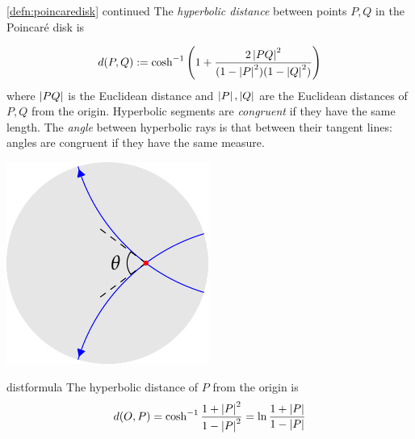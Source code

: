 \begin{defn*}{\ref{defn:poincaredisk} continued}
	The \emph{hyperbolic distance} between points $P,Q$ in the Poincaré disk is\footnotemark{}

	\begin{minipage}[t]{0.7\linewidth}\vspace{-12pt}
		\[
			d(P,Q):=\cosh^{-1}\left(1+\frac{2\left| PQ\right|^2}{(1-\left| P\right|^2)(1-\left| Q\right|^2)}\right)
		\]
		where $\left| PQ\right|$ is the Euclidean distance and $\left| P\right|,\left| Q\right|$ are the Euclidean distances of $P,Q$ from the origin.\smallbreak
		Hyperbolic segments are \emph{congruent} if they have the same length.\smallbreak
		The \emph{angle} between hyperbolic rays is that between their tangent lines: angles are congruent if they have the same measure.
	\end{minipage}
	\hfill
	\begin{minipage}[t]{0.29\linewidth}\vspace{-5pt}
		\flushright\includegraphics{models-angle}
	\end{minipage}
\end{defn*}

\begin{lemm}{}{distformula}
	The hyperbolic distance of $P$ from the origin is
	\[
		d(O,P)=\cosh^{-1}\frac{1+\left| P\right|^2}{1-\left| P\right|^2}=\ln\frac{1+\left| P\right|}{1-\left| P\right|}
	\]
\end{lemm}



